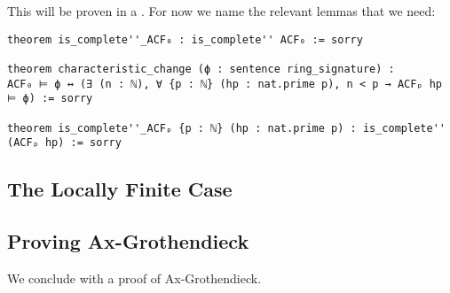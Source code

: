 This will be proven in a .
For now we name the relevant lemmas that we need:

\begin{lstlisting}
theorem is_complete''_ACF₀ : is_complete'' ACF₀ := sorry

theorem characteristic_change (ϕ : sentence ring_signature) :
ACF₀ ⊨ ϕ ↔ (∃ (n : ℕ), ∀ {p : ℕ} (hp : nat.prime p), n < p → ACFₚ hp ⊨ ϕ) := sorry

theorem is_complete''_ACFₚ {p : ℕ} (hp : nat.prime p) : is_complete'' (ACFₚ hp) := sorry
\end{lstlisting}

\subsection{The Locally Finite Case}


\subsection{Proving Ax-Grothendieck}

We conclude with a proof of Ax-Grothendieck.

